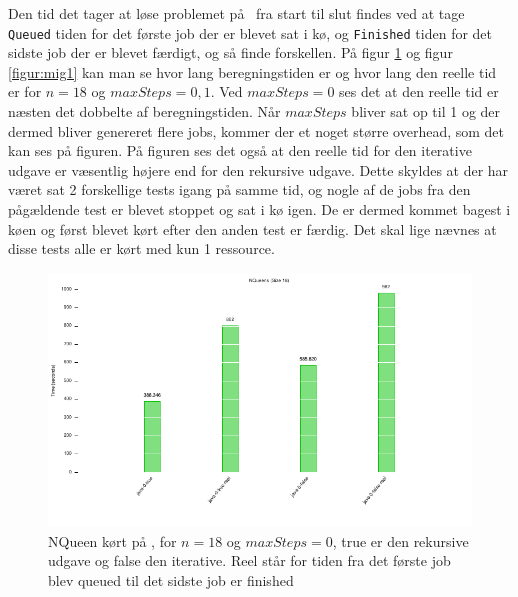 Den tid det tager at løse problemet på \mig\ fra start til slut findes ved at
tage \texttt{Queued} tiden for det første job der er blevet sat i kø, og
\texttt{Finished} tiden for det sidste job der er blevet færdigt, og så finde
forskellen.  På figur \ref{figur:mig} og figur \ref{figur:mig1} kan man se hvor lang beregningstiden er og
hvor lang den reelle tid er for $n=18$ og $maxSteps=0,1$. Ved $maxSteps=0$
ses det at den reelle tid er næsten det dobbelte af beregningstiden. Når
$maxSteps$ bliver sat op til 1 og der dermed bliver genereret flere jobs, kommer
der et noget større overhead, som det kan ses på figuren. På figuren ses det
også at den reelle tid for den iterative udgave er væsentlig højere end for
den rekursive udgave. Dette skyldes at der har været sat 2 forskellige tests
igang på samme tid, og nogle af de jobs fra den pågældende test er blevet
stoppet og sat i kø igen. De er dermed kommet bagest i køen og først blevet kørt
efter den anden test er færdig. Det skal lige nævnes at disse tests alle er kørt
med kun 1 ressource.

\begin{figure}[h]
\begin{center}
\includegraphics{../benchmarks/mig.pdf}
\caption{NQueen kørt på \mig, for $n=18$ og $maxSteps=0$, true er den
rekursive udgave og false den iterative. Reel står for tiden fra det første job
blev queued til det sidste job er finished}
\label{figur:mig}
\end{center}
\end{figure}

